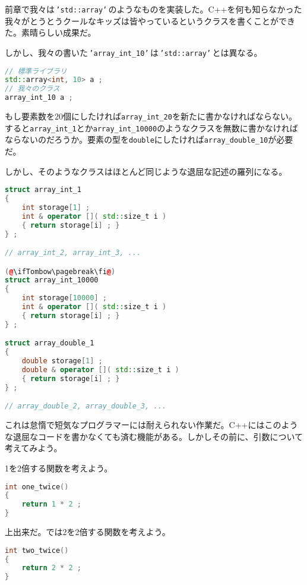 

前章で我々は\,\texttt{'std::array'}\,のようなものを実装した。C++を何も知らなかった我々がとうとうクールなキッズは皆やっているというクラスを書くことができた。素晴らしい成果だ。

しかし、我々の書いた\,\texttt{'array\_int\_10'}\,は\,\texttt{'std::array'}\,とは異なる。

\begin{lstlisting}[language={C++}]
// 標準ライブラリ
std::array<int, 10> a ;
// 我々のクラス
array_int_10 a ;
\end{lstlisting}

もし要素数を20個にしたければ\texttt{array\_int\_20}を新たに書かなければならない。すると\texttt{array\_int\_1}とか\texttt{array\_int\_10000}のようなクラスを無数に書かなければならないのだろうか。要素の型を\texttt{double}にしたければ\texttt{array\_double\_10}が必要だ。

しかし、そのようなクラスはほとんど同じような退屈な記述の羅列になる。

\begin{lstlisting}[language={C++}]
struct array_int_1
{
    int storage[1] ;
    int & operator []( std::size_t i )
    { return storage[i] ; }
} ;

// array_int_2, array_int_3, ...

(@\ifTombow\pagebreak\fi@)
struct array_int_10000
{
    int storage[10000] ;
    int & operator []( std::size_t i )
    { return storage[i] ; }
} ;

struct array_double_1
{
    double storage[1] ;
    double & operator []( std::size_t i )
    { return storage[i] ; }
} ;

// array_double_2, array_double_3, ...
\end{lstlisting}

これは怠惰で短気なプログラマーには耐えられない作業だ。C++にはこのような退屈なコードを書かなくても済む機能がある。しかしその前に、引数について考えてみよう。


1を2倍する関数を考えよう。

\begin{lstlisting}[language={C++}]
int one_twice()
{
    return 1 * 2 ;
}
\end{lstlisting}

上出来だ。では2を2倍する関数を考えよう。

\begin{lstlisting}[language={C++}]
int two_twice()
{
    return 2 * 2 ;
}
\end{lstlisting}

